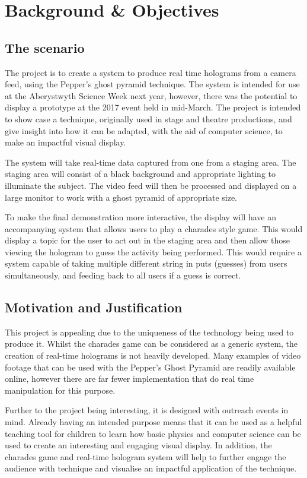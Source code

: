 \chapter{Background \& Objectives}
\section{The scenario}
The project is to create a system to produce real time holograms from a camera feed, using the Pepper’s ghost pyramid technique. The system is intended for use at the Aberystwyth Science Week next year, however, there was the potential to display a prototype at the 2017 event held in mid-March. The project is intended to show case a technique, originally used in stage and theatre productions, and give insight into how it can be adapted, with the aid of computer science, to make an impactful visual display.

The system will take real-time data captured from one from a staging area. The staging area will consist of a black background and appropriate lighting to illuminate the subject. The video feed will then be processed and displayed on a large monitor to work with a ghost pyramid of appropriate size.

To make the final demonstration more interactive, the display will have an accompanying system that allows users to play a charades style game. This would display a topic for the user to act out in the staging area and then allow those viewing the hologram to guess the activity being performed. This would require a system capable of taking multiple different string in puts (guesses) from users simultaneously, and feeding back to all users if a guess is correct. 

\section{Motivation and Justification}
This project is appealing due to the uniqueness of the technology being used to produce it. Whilst the charades game can be considered as a generic system, the creation of real-time holograms is not heavily developed. Many examples of video footage that can be used with the Pepper's Ghost Pyramid are readily available online, however there are far fewer implementation that do real time manipulation for this purpose.

Further to the project being interesting, it is designed with outreach events in mind. Already having an intended purpose means that it can be used as a helpful teaching tool for children to learn how basic physics and computer science can be used to create an interesting and engaging visual display. In addition, the charades game and real-time hologram system will help to further engage the audience with technique and visualise an impactful application of the technique. 

